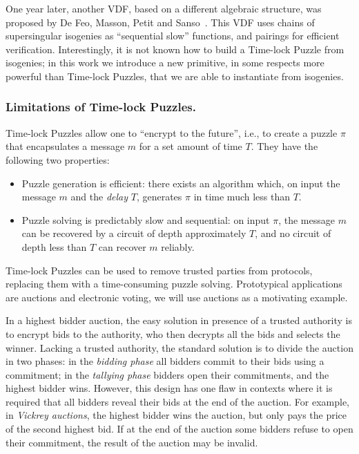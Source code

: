 \documentclass{llncs}
\begin{document}
One year later, another VDF, based on a different algebraic structure,
was proposed by De Feo, Masson, Petit and
Sanso~\cite{10.1007/978-3-030-34578-5_10}. %
This VDF uses chains of supersingular isogenies as ``sequential slow''
functions, and pairings for efficient verification. %
Interestingly, it is not known how to build a Time-lock Puzzle from
isogenies; in this work we introduce a new primitive, in some respects
more powerful than Time-lock Puzzles, that we are able to instantiate
from isogenies.

\subsubsection{Limitations of Time-lock Puzzles.}
Time-lock Puzzles allow one to ``encrypt to the future'', i.e., to
create a puzzle $\pi$ that encapsulates a message $m$ for a set amount
of time $T$. %
They have the following two properties:
\begin{itemize}
\item Puzzle generation is efficient: there exists an algorithm which,
  on input the message $m$ and the \emph{delay} $T$, generates $\pi$
  in time much less than $T$.
\item Puzzle solving is predictably slow and sequential: on input
  $\pi$, the message $m$ can be recovered by a circuit of depth
  approximately $T$, and no circuit of depth less than $T$ can
  recover $m$ reliably.
\end{itemize}

Time-lock Puzzles can be used to remove trusted parties from
protocols, replacing them with a time-consuming puzzle solving. %
Prototypical applications are auctions and electronic voting, we will
use auctions as a motivating example.

In a highest bidder auction, the easy solution in presence of a
trusted authority is to encrypt bids to the authority, who then
decrypts all the bids and selects the winner. %
Lacking a trusted authority, the standard solution is to divide the
auction in two phases: in the \emph{bidding phase} all bidders commit
to their bids using a commitment; in the \emph{tallying phase} bidders
open their commitments, and the highest bidder wins. %
However, this design has one flaw in contexts where it is required
that all bidders reveal their bids at the end of the auction. %
For example, in \emph{Vickrey auctions}, the highest bidder wins the
auction, but only pays the price of the second highest bid. %
If at the end of the auction some bidders refuse to open their
commitment, the result of the auction may be invalid.
\end{document}
